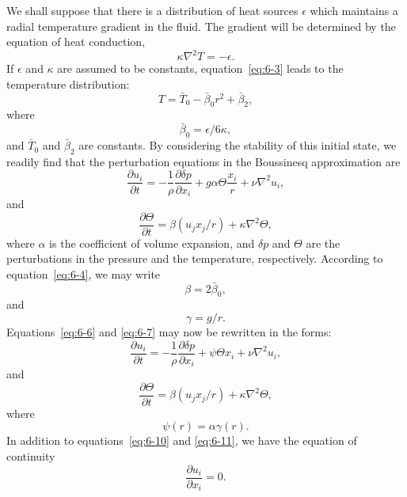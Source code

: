 We shall suppose that there is a distribution of heat sources $\epsilon$ which
maintains a radial temperature gradient in the fluid. The gradient will
be determined by the equation of heat conduction,
\begin{equation}\label{eq:6-3}
\kappa\nabla^2 T = -\epsilon.
\end{equation}
If $\epsilon$ and $\kappa$ are assumed to be constants, equation~\eqref{eq:6-3} leads to the tempera\-ture distribution:
\begin{equation}\label{eq:6-4}
T = \bar{T}_0 - \bar{\beta}_0 r^2 + \bar{\beta}_2,
\end{equation}
where
\begin{equation}\label{eq:6-5}
\bar{\beta}_0 = \epsilon/6\kappa,
\end{equation}
and $\bar{T}_0$ and $\bar{\beta}_2$ are constants. By considering the stability of this initial
state, we readily find that the perturbation equations in the Boussinesq
approximation are
\begin{equation}\label{eq:6-6}
\frac{\partial u_i}{\partial t} = -\frac{1}{\rho}\frac{\partial \delta p}{\partial x_i} + g\alpha\Theta\frac{x_i}{r} + \nu\nabla^2 u_i,
\end{equation}
and
\begin{equation}\label{eq:6-7}
\frac{\partial \Theta}{\partial t} = \beta(u_j x_j/r) + \kappa\nabla^2\Theta,
\end{equation}
where $\alpha$ is the coefficient of volume expansion, and $\delta p$ and $\Theta$ are the
perturbations in the pressure and the temperature, respectively.
According to equation~\eqref{eq:6-4}, we may write
\begin{equation}\label{eq:6-8}
\beta = 2\bar{\beta}_0,
\end{equation}
and
\begin{equation}\label{eq:6-9}
\gamma = g/r.
\end{equation}
Equations~\eqref{eq:6-6} and \eqref{eq:6-7} may now be rewritten in the forms:
\begin{equation}\label{eq:6-10}
\frac{\partial u_i}{\partial t} = -\frac{1}{\rho}\frac{\partial \delta p}{\partial x_i} + \psi\Theta x_i + \nu\nabla^2 u_i,
\end{equation}
and
\begin{equation}\label{eq:6-11}
\frac{\partial \Theta}{\partial t} = \beta(u_j x_j/r) + \kappa\nabla^2\Theta,
\end{equation}
where
\begin{equation}\label{eq:6-12}
\psi(r) = \alpha\gamma(r).
\end{equation}
In addition to equations~\eqref{eq:6-10} and \eqref{eq:6-11}, we have the equation of con\-tinuity
\begin{equation}\label{eq:6-13}
\frac{\partial u_i}{\partial x_i} = 0.
\end{equation}

